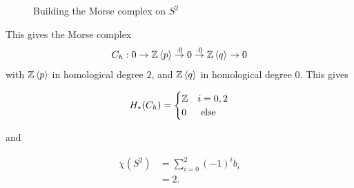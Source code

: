 \documentclass{amsart}
\begin{document}
\begin{figure}[h]
\caption{Building the Morse complex on $S^2$}
\label{fig:torusfibersS2}
\end{figure}
\FloatBarrier


This gives the Morse complex\[ C_h: 0 \rightarrow \mathbb{Z}\left<p\right> \stackrel{\cdot 0}{\rightarrow} 0 \stackrel{\cdot 0}{\rightarrow} \mathbb{Z}\left< q \right> \rightarrow 0 \] with $\mathbb{Z}\left<p\right>$ in homological degree $2$, and $\mathbb{Z}\left<q\right>$ in homological degree $0$. This gives 

\begin{align*}
    H_*(C_h) = \begin{cases} \mathbb{Z} & i=0,2\\ 0 &\text{ else} \end{cases}
\end{align*}

and

\begin{align*}
    \chi(S^2) &= \sum_{i=0}^2 (-1)^i b_i\\
    &= 2.
\end{align*}
\end{document}
